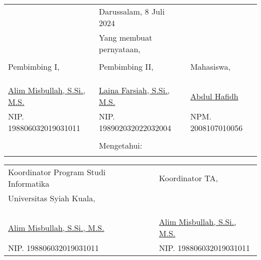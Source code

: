 \vspace{0.4cm}
{\renewcommand{\arraystretch}{0.8}
\centering
\begin{tabular}{lll}
	&Darussalam, 8 Juli 2024		& \\
	&Yang membuat pernyataan,			& \\
	&&\\
	Pembimbing I,							&Pembimbing II,							&Mahasiswa,\\
	&&\\
	&&\\
	&&\\
	\underline{Alim Misbullah, S.Si., M.S.}	&\underline{Laina Farsiah, S.Si., M.S.} &\underline{Abdul Hafidh}\\
	NIP. 198806032019031011				&NIP. 198902032022032004				&NPM. 2008107010056\\
	&&\\
	&Mengetahui:\\			&
\end{tabular}
}
{\renewcommand{\arraystretch}{0.8}
\begin{tabular}{lll}
	Koordinator Program Studi Informatika	&\qquad\qquad  &Koordinator TA,\\
	Universitas Syiah Kuala,&\quad\quad  &\\
	&&\\
	&&\\
	&&\\
	\underline{Alim Misbullah, S.Si., M.S.}	&\quad\quad  &\underline{Alim Misbullah, S.Si., M.S.}\\
	NIP. 198806032019031011						&\quad\quad  &NIP. 198806032019031011				
\end{tabular}
}